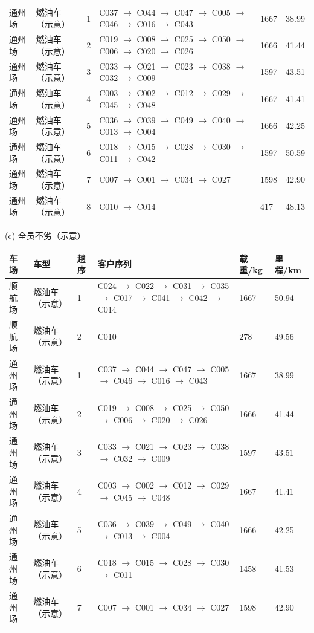 \documentclass{article}
\begin{document}
{\begin{tabular}{@{}L{1.25cm}L{1.55cm}R{0.55cm}L{5.65cm}R{1.05cm}R{1.05cm}@{}}
通州场 & 燃油车（示意） & 1 & C037 $\to$ C044 $\to$ C047 $\to$ C005 $\to$ C046 $\to$ C016 $\to$ C043 & 1667 & 38.99 \\
通州场 & 燃油车（示意） & 2 & C019 $\to$ C008 $\to$ C025 $\to$ C050 $\to$ C006 $\to$ C020 $\to$ C026 & 1666 & 41.44 \\
通州场 & 燃油车（示意） & 3 & C033 $\to$ C021 $\to$ C023 $\to$ C038 $\to$ C032 $\to$ C009 & 1597 & 43.51 \\
通州场 & 燃油车（示意） & 4 & C003 $\to$ C002 $\to$ C012 $\to$ C029 $\to$ C045 $\to$ C048 & 1667 & 41.41 \\
通州场 & 燃油车（示意） & 5 & C036 $\to$ C039 $\to$ C049 $\to$ C040 $\to$ C013 $\to$ C004 & 1666 & 42.25 \\
通州场 & 燃油车（示意） & 6 & C018 $\to$ C015 $\to$ C028 $\to$ C030 $\to$ C011 $\to$ C042 & 1597 & 50.59 \\
通州场 & 燃油车（示意） & 7 & C007 $\to$ C001 $\to$ C034 $\to$ C027 & 1598 & 42.90 \\
通州场 & 燃油车（示意） & 8 & C010 $\to$ C014 & 417 & 48.13 \\
\bottomrule
\end{tabular}
\par\medskip
{\sffamily (c) 全员不劣（示意）}\par\smallskip
\noindent\begin{tabular}{@{}L{1.25cm}L{1.55cm}R{0.55cm}L{5.65cm}R{1.05cm}R{1.05cm}@{}}
\toprule
车场 & 车型 & 趟序 & 客户序列 & 载重/kg & 里程/km \\
\midrule
顺航场 & 燃油车（示意） & 1 & C024 $\to$ C022 $\to$ C031 $\to$ C035 $\to$ C017 $\to$ C041 $\to$ C042 $\to$ C014 & 1667 & 50.94 \\
顺航场 & 燃油车（示意） & 2 & C010 & 278 & 49.56 \\
通州场 & 燃油车（示意） & 1 & C037 $\to$ C044 $\to$ C047 $\to$ C005 $\to$ C046 $\to$ C016 $\to$ C043 & 1667 & 38.99 \\
通州场 & 燃油车（示意） & 2 & C019 $\to$ C008 $\to$ C025 $\to$ C050 $\to$ C006 $\to$ C020 $\to$ C026 & 1666 & 41.44 \\
通州场 & 燃油车（示意） & 3 & C033 $\to$ C021 $\to$ C023 $\to$ C038 $\to$ C032 $\to$ C009 & 1597 & 43.51 \\
通州场 & 燃油车（示意） & 4 & C003 $\to$ C002 $\to$ C012 $\to$ C029 $\to$ C045 $\to$ C048 & 1667 & 41.41 \\
通州场 & 燃油车（示意） & 5 & C036 $\to$ C039 $\to$ C049 $\to$ C040 $\to$ C013 $\to$ C004 & 1666 & 42.25 \\
通州场 & 燃油车（示意） & 6 & C018 $\to$ C015 $\to$ C028 $\to$ C030 $\to$ C011 & 1458 & 41.53 \\
通州场 & 燃油车（示意） & 7 & C007 $\to$ C001 $\to$ C034 $\to$ C027 & 1598 & 42.90 \\
\bottomrule
\end{tabular}
\par\medskip
}
\end{document}
